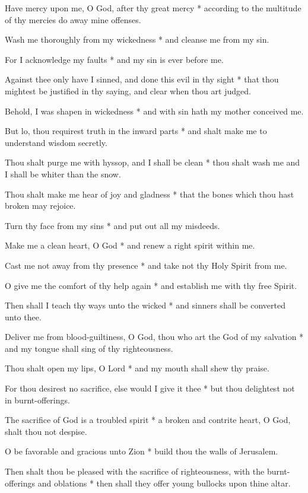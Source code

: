 Have mercy upon me, O God, after thy great mercy * according to the multitude of thy mercies do away mine offenses.
	
Wash me thoroughly from my wickedness * and cleanse me from my sin.
	
For I acknowledge my faults * and my sin is ever before me.
	
Against thee only have I sinned, and done this evil in thy sight * that thou mightest be justified in thy saying, and clear when thou art judged.

Behold, I was shapen in wickedness * and with sin hath my mother conceived me.
	
But lo, thou requirest truth in the inward parts * and shalt make me to understand wisdom secretly.
	
Thou shalt purge me with hyssop, and I shall be clean * thou shalt wash me and I shall be whiter than the snow.
	
Thou shalt make me hear of joy and gladness * that the bones which thou hast broken may rejoice.
	
Turn thy face from my sins * and put out all my misdeeds.
	
Make me a clean heart, O God * and renew a right spirit within me.
	
Cast me not away from thy presence * and take not thy Holy Spirit from me.
	
O give me the comfort of thy help again * and establish me with thy free Spirit.
	
Then shall I teach thy ways unto the wicked * and sinners shall be converted unto thee.
	
Deliver me from blood-guiltiness, O God, thou who art the God of my salvation * and my tongue shall sing of thy righteousness.
	
Thou shalt open my lips, O Lord * and my mouth shall shew thy praise.
	
For thou desirest no sacrifice, else would I give it thee * but thou delightest not in burnt-offerings.
	
The sacrifice of God is a troubled spirit * a broken and contrite heart, O God, shalt thou not despise.
	
O be favorable and gracious unto Zion * build thou the walls of Jerusalem.
	
Then shalt thou be pleased with the sacrifice of righteousness, with the burnt-offerings and oblations * then shall they offer young bullocks upon thine altar.
